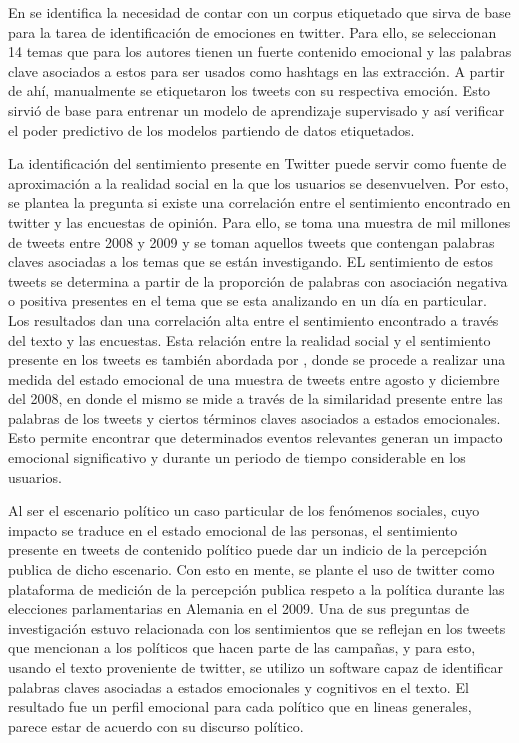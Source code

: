 En \cite{roberts2012empatweet} se identifica la necesidad de contar con un corpus etiquetado que sirva de base para la tarea de identificación de emociones en twitter. Para ello, se seleccionan  14 temas que para los autores tienen un fuerte contenido emocional y las palabras clave asociados a estos para ser usados como hashtags en las extracción. A partir de ahí, manualmente se etiquetaron los tweets con su respectiva emoción. Esto sirvió de base para entrenar un modelo de aprendizaje supervisado y así verificar el poder predictivo de los modelos partiendo de datos etiquetados.


La identificación del sentimiento presente en Twitter puede servir como fuente de aproximación a la realidad social en la que los usuarios se desenvuelven. Por esto,\cite{o2010tweets} se plantea la pregunta si existe una correlación entre el sentimiento encontrado en twitter y las encuestas de opinión. Para ello, se toma una muestra de mil millones de tweets entre 2008 y 2009 y se toman aquellos tweets que contengan palabras claves asociadas a los temas que se están investigando. EL sentimiento de estos tweets se determina a partir de la proporción de palabras con asociación negativa o positiva presentes en el tema que se esta analizando en un día en particular. Los resultados dan una correlación alta entre el sentimiento encontrado a través del texto y las encuestas. Esta relación entre la realidad social y el sentimiento presente en los tweets es también abordada por \cite{bollen2011modeling}, donde se procede a realizar una medida del estado emocional de una muestra de tweets entre agosto y diciembre del 2008, en donde el mismo se mide a través de la similaridad presente entre las palabras de los tweets y ciertos términos claves asociados a estados emocionales. Esto permite encontrar que determinados eventos relevantes generan un impacto emocional significativo y durante un periodo de tiempo considerable en los usuarios.




Al ser el escenario político un caso particular de los fenómenos sociales, cuyo impacto se traduce en el estado emocional de las personas, el sentimiento presente en tweets de contenido político puede dar un indicio de la percepción publica de dicho escenario. Con esto en mente, \cite{tumasjan2010predicting} se plante el uso de twitter como plataforma de medición de la percepción publica respeto a la política durante las elecciones parlamentarias en Alemania en el 2009. Una de sus preguntas de investigación estuvo relacionada con los sentimientos que se reflejan en los tweets que mencionan a los políticos que hacen parte de las campañas, y para esto, usando el texto proveniente de twitter, se utilizo un software capaz de identificar palabras claves asociadas a estados emocionales y cognitivos en el texto. El resultado fue un perfil emocional para cada político que en lineas generales, parece estar de acuerdo con su discurso político.

